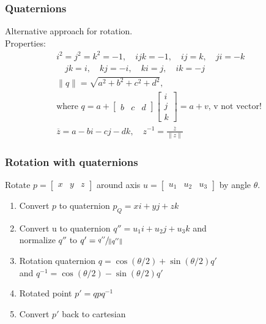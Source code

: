 \documentclass[a4paper,10pt]{article}
\begin{document}
\subsubsection{Quaternions}
Alternative approach for rotation. \\
Properties:
\begin{gather*}
	i^2=j^2=k^2 = -1, \quad ijk = -1, \quad ij=k, \quad ji=-k \\ \quad jk=i, \quad kj = -i, \quad ki = j, \quad ik = -j \\
	\lVert q \rVert = \sqrt{a^2+b^2+c^2+d^2},\\ \text{where } q = a + \left[\begin{smallmatrix} b & c & d \end{smallmatrix}\right] \left[\begin{smallmatrix} i \\ j \\ k \end{smallmatrix}\right] = a + v \text{, v not vector!} \\
	\overline{z} = a - bi - cj - dk, \quad z^{-1} = \frac{\overline{z}}{\lVert z \rVert}
\end{gather*}

\subsubsection{Rotation with quaternions} Rotate \( p = \left[\begin{smallmatrix} x & y & z \end{smallmatrix}\right] \) around axis \( u = \left[\begin{smallmatrix} u_{1} & u_{2} & u_{3} \end{smallmatrix}\right] \) by angle \( \theta  \).
\begin{enumerate}
    \item Convert \( p \) to quaternion \( p_Q = xi + yj + zk \)
    \item Convert u to quaternion \( q'' = u_{1}i+u_{2}j+u_{3}k \) and \\ normalize \( q'' \) to \( q' = \sfrac{q''}{\lVert q'' \rVert} \)
    \item Rotation quaternion \( q = \cos (\theta /2) + \sin (\theta /2) q' \) \\ and \( q^{-1} = \cos (\theta /2) - \sin (\theta /2) q' \)
    \item Rotated point \( p' = q p q^{-1} \)
    \item Convert \( p' \) back to cartesian
\end{enumerate}
\end{document}
